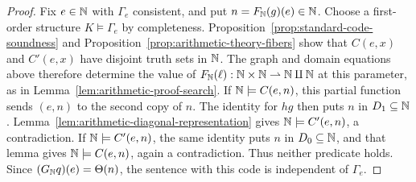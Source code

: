 \begin{proof}
Fix $e\in\mathbb N$ with $\Gamma_e$ consistent, and put
$n=F_{\mathbb N}(g)(e)\in\mathbb N$. Choose a first-order structure
$K\models\Gamma_e$ by completeness.
Proposition~\ref{prop:standard-code-soundness} and
Proposition~\ref{prop:arithmetic-theory-fibers} show that
$C(e,x)$ and $C'(e,x)$ have disjoint truth sets in $\mathbb N$.
The graph and domain equations above therefore determine the
value of $F_{\mathbb N}(\ell):\mathbb N\times\mathbb N\rightharpoonup\mathbb N\amalg\mathbb N$
at this parameter, as in Lemma~\ref{lem:arithmetic-proof-search}.
If $\mathbb N\models C(e,n)$, this partial function sends $(e,n)$
to the second copy of $n$. The identity for $hg$ then puts
$n$ in $D_1\subseteq\mathbb N$.
Lemma~\ref{lem:arithmetic-diagonal-representation} gives
$\mathbb N\models C'(e,n)$, a contradiction.
If $\mathbb N\models C'(e,n)$, the same identity puts $n$ in
$D_0\subseteq\mathbb N$, and that lemma gives
$\mathbb N\models C(e,n)$, again a contradiction.
Thus neither predicate holds. Since $(G_{\mathbb N}q)(e)=\Theta(n)$,
the sentence with this code is independent of $\Gamma_e$.
\end{proof}
